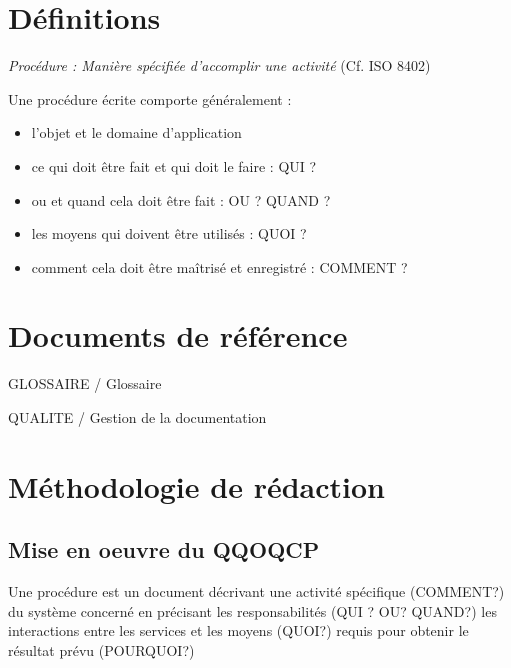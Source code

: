 \documentclass{mise_en_page}
\begin{document}
\maketitle

\begin{historique}
\end{historique}

\newpage

\tableofcontents

\section{Définitions}
\emph{Procédure : Manière spécifiée d’accomplir une activité} (Cf. ISO 8402)

Une procédure écrite comporte généralement :

\begin{itemize}
\item l’objet et  le domaine d’application
\item ce qui doit être fait et qui doit le faire : QUI ?
\item ou et quand cela doit être fait : OU ? QUAND ?
\item les moyens qui doivent être utilisés : QUOI ?
\item comment cela doit  être maîtrisé et  enregistré : COMMENT ?
\end{itemize}

\section{Documents de référence}

GLOSSAIRE / Glossaire

QUALITE / Gestion de la documentation


\section{Méthodologie de rédaction}
\subsection{Mise en oeuvre du QQOQCP}
Une procédure est un document décrivant une activité spécifique
(COMMENT?) du système concerné en précisant les responsabilités (QUI ?
OU? QUAND?)  les interactions entre les services et les moyens (QUOI?)
requis pour obtenir le résultat prévu (POURQUOI?)
\end{document}
